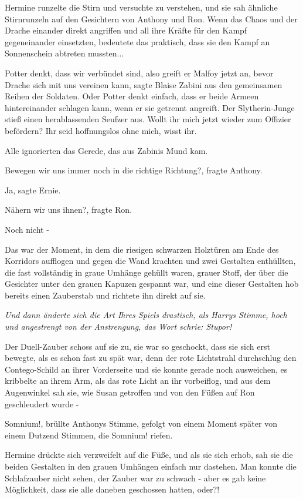 Hermine runzelte die Stirn und versuchte zu verstehen, und sie sah ähnliche
Stirnrunzeln auf den Gesichtern von Anthony und Ron. Wenn das Chaos und der
Drache einander direkt angriffen und all ihre Kräfte für den Kampf gegeneinander
einsetzten, bedeutete das praktisch, dass sie den Kampf an Sonnenschein abtreten
mussten...

\glqq Potter denkt, dass wir verbündet sind, also greift er Malfoy jetzt an,
bevor Drache sich mit uns vereinen kann\grqq{}, sagte Blaise Zabini aus den
gemeinsamen Reihen der Soldaten. \glqq Oder Potter denkt einfach, dass er beide
Armeen hintereinander schlagen kann, wenn er sie getrennt angreift.\grqq{} Der
Slytherin-Junge stieß einen herablassenden Seufzer aus. \glqq Wollt ihr mich
jetzt wieder zum Offizier befördern? Ihr seid hoffnungslos ohne mich, wisst
ihr.\grqq{}

Alle ignorierten das Gerede, das aus Zabinis Mund kam.

\glqq Bewegen wir uns immer noch in die richtige Richtung?\grqq{}, fragte
Anthony.

\glqq Ja\grqq{}, sagte Ernie.

\glqq Nähern wir uns ihnen?\grqq{}, fragte Ron.

\glqq Noch nicht -\grqq{}

Das war der Moment, in dem die riesigen schwarzen Holztüren am Ende des
Korridors aufflogen und gegen die Wand krachten und zwei Gestalten enthüllten,
die fast vollständig in graue Umhänge gehüllt waren, grauer Stoff, der über die
Gesichter unter den grauen Kapuzen gespannt war, und eine dieser Gestalten hob
bereits einen Zauberstab und richtete ihn direkt auf sie.

\emph{Und dann änderte sich die Art Ihres Spiels drastisch, als Harrys Stimme,
hoch und angestrengt von der Anstrengung, das Wort schrie: \glqq Stupor!\grqq{}
}

Der Duell-Zauber schoss auf sie zu, sie war so geschockt, dass sie sich erst
bewegte, als es schon fast zu spät war, denn der rote Lichtstrahl durchschlug
den Contego-Schild an ihrer Vorderseite und sie konnte gerade noch ausweichen,
es kribbelte an ihrem Arm, als das rote Licht an ihr vorbeiflog, und aus dem
Augenwinkel sah sie, wie Susan getroffen und von den Füßen auf Ron geschleudert
wurde -

\glqq Somnium!\grqq{}, brüllte Anthonys Stimme, gefolgt von einem Moment später
von einem Dutzend Stimmen, die \glqq Somnium!\grqq{} riefen.

Hermine drückte sich verzweifelt auf die Füße, und als sie sich erhob, sah sie
die beiden Gestalten in den grauen Umhängen einfach nur dastehen. Man konnte die
Schlafzauber nicht sehen, der Zauber war zu schwach - aber es gab keine
Möglichkeit, dass sie alle daneben geschossen hatten, oder?!

